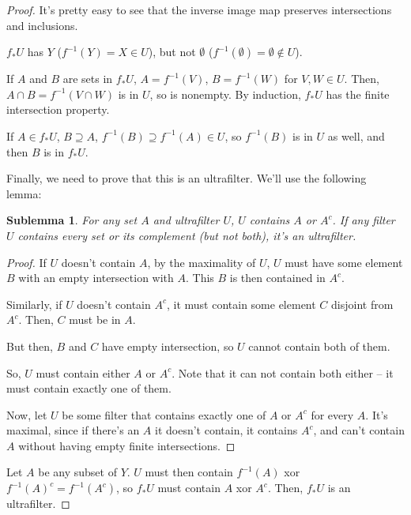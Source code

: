 \documentclass{article}
\newtheorem*{sublemma}{Sublemma}
\begin{document}
          \begin{proof}
          It's pretty easy to see that the inverse image map preserves
          intersections and inclusions.

          $f_*U$ has $Y$ ($f^{-1}(Y) = X \in U$), but not $\emptyset$
          ($f^{-1}(\emptyset) = \emptyset \notin U$).

          If $A$ and $B$ are sets in $f_*U$, $A = f^{-1}(V)$, $B = f^{-1}(W)$ for
          $V, W \in U$. Then, $A \cap B = f^{-1}(V \cap W)$ is in $U$, so is
          nonempty. By induction, $f_*U$ has the finite intersection property.

          If $A \in f_*U$, $B \supseteq A$, $f^{-1}(B) \supseteq f^{-1}(A) \in U$,
          so $f^{-1}(B)$ is in $U$ as well, and then $B$ is in $f_*U$.

          Finally, we need to prove that this is an ultrafilter. We'll use the
          following lemma:

          \begin{sublemma}
          For any set $A$ and ultrafilter $U$, $U$ contains $A$ or $A^c$. If any
          filter $U$ contains every set or its complement (but not both), it's
          an ultrafilter.
          \end{sublemma}

          \begin{proof}
          If $U$ doesn't contain $A$, by the maximality of $U$, $U$ must have
          some element $B$ with an empty intersection with $A$. This $B$ is then
          contained in $A^c$.

          Similarly, if $U$ doesn't contain $A^c$, it must contain some element
          $C$ disjoint from $A^c$. Then, $C$ must be in $A$.

          But then, $B$ and $C$ have empty intersection, so $U$ cannot contain
          both of them.

          So, $U$ must contain either $A$ or $A^c$. Note that it can not contain
          both either -- it must contain exactly one of them.

          Now, let $U$ be some filter that contains exactly one of $A$
          or $A^c$ for every $A$. It's maximal, since if there's an $A$ it
          doesn't contain, it contains $A^c$, and can't contain $A$ without
          having empty finite intersections.
          \end{proof}

          Let $A$ be any subset of $Y$. $U$ must then contain $f^{-1}(A)$ xor
          $f^{-1}(A)^c = f^{-1}(A^c)$, so $f_*U$ must contain $A$ xor $A^c$. Then,
          $f_*U$ is an ultrafilter.
          \end{proof}
\end{document}
